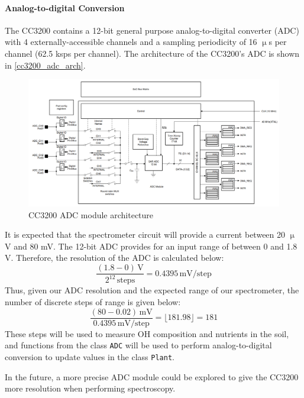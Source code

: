 \paragraph{Analog-to-digital Conversion}
The CC3200 contains a 12-bit general purpose analog-to-digital converter
(ADC) with 4 externally-accessible channels and a sampling periodicity of
16 $\upmu$s per channel (62.5 ksps per channel). The architecture of the
CC3200's ADC is shown in \autoref{cc3200_adc_arch}.
\begin{figure}[H]
    \caption{CC3200 ADC module architecture \cite{swra679}}
    \label{cc3200_adc_arch}
    \centering
    \includegraphics[width=\textwidth]{images/cc3200_adc_arch.png}
\end{figure}

It is expected that the spectrometer circuit will provide a current
between 20 $\upmu$V and 80 mV. The 12-bit ADC provides for an input range of
between 0 and 1.8 V. Therefore, the resolution of the ADC is calculated
below:
\begin{equation}
    \label{eq:adc_res}
    \frac{(1.8 - 0)\,\mathrm{V}}{2^{12}\,\mathrm{steps}} =
    0.4395\,\mathrm{mV}/\mathrm{step}
\end{equation}
Thus, given our ADC resolution and the expected range of our spectrometer,
the number of discrete steps of range is given below:
\begin{equation}
    \label{eq:adc_steps}
    \frac{(80 - 0.02)\,\mathrm{mV}}{0.4395\,\mathrm{mV}/\mathrm{step}} =
    \lfloor181.98\rfloor = 181
\end{equation}
These steps will be used to measure OH composition and nutrients in the
soil, and functions from the class \texttt{ADC} will be used to perform
analog-to-digital conversion to update values in the class \texttt{Plant}.

In the future, a more precise ADC module could be explored to give the
CC3200 more resolution when performing spectroscopy.


